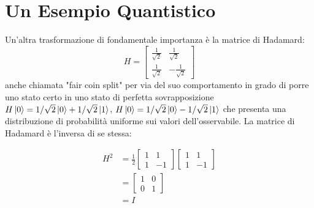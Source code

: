 \documentclass[12pt,a4paper,openright]{report}
\begin{document}
\section{Un Esempio Quantistico}

Un'altra trasformazione di fondamentale importanza è la matrice di Hadamard:
\[
    H=\begin{bmatrix}
        \frac{1}{\sqrt2} & \frac{1}{\sqrt2} \\
        \frac{1}{\sqrt2} & -\frac{1}{\sqrt2} 
    \end{bmatrix}
\] 
anche chiamata "fair coin split" per via del suo comportamento in grado di porre uno stato certo in uno stato di perfetta sovrapposizione 
$H\ket0 = 1/\sqrt2\ket0 + 1/\sqrt2\ket1$, $H\ket0 = 1/\sqrt2\ket0 - 1/\sqrt2\ket1$ che presenta una distribuzione di probabilità uniforme
sui valori dell'osservabile.
La matrice di Hadamard è l'inversa di se stessa:
\begin{center}
    \begin{align*}
        H^2 &= \frac{1}{2}\begin{bmatrix}
            1 & 1 \\
            1 & -1 
        \end{bmatrix}\begin{bmatrix}
            1 & 1 \\
            1 & -1 
        \end{bmatrix}\\
        &= \begin{bmatrix}
            1 & 0\\
            0 & 1
        \end{bmatrix}\\ 
        &= I
    \end{align*}
\end{center}
 
\end{document}
